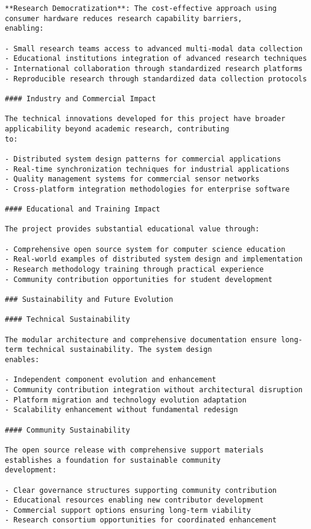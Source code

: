 \documentclass[12pt,a4paper]{report}
\begin{document}
\begin{verbatim}
**Research Democratization**: The cost-effective approach using consumer hardware reduces research capability barriers,
enabling:

- Small research teams access to advanced multi-modal data collection
- Educational institutions integration of advanced research techniques
- International collaboration through standardized research platforms
- Reproducible research through standardized data collection protocols

#### Industry and Commercial Impact

The technical innovations developed for this project have broader applicability beyond academic research, contributing
to:

- Distributed system design patterns for commercial applications
- Real-time synchronization techniques for industrial applications
- Quality management systems for commercial sensor networks
- Cross-platform integration methodologies for enterprise software

#### Educational and Training Impact

The project provides substantial educational value through:

- Comprehensive open source system for computer science education
- Real-world examples of distributed system design and implementation
- Research methodology training through practical experience
- Community contribution opportunities for student development

### Sustainability and Future Evolution

#### Technical Sustainability

The modular architecture and comprehensive documentation ensure long-term technical sustainability. The system design
enables:

- Independent component evolution and enhancement
- Community contribution integration without architectural disruption
- Platform migration and technology evolution adaptation
- Scalability enhancement without fundamental redesign

#### Community Sustainability

The open source release with comprehensive support materials establishes a foundation for sustainable community
development:

- Clear governance structures supporting community contribution
- Educational resources enabling new contributor development
- Commercial support options ensuring long-term viability
- Research consortium opportunities for coordinated enhancement


\end{verbatim}
\end{document}
